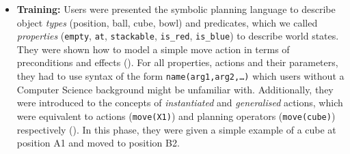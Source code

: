 \begin{itemize}
  \item{\begin{sloppypar} \textbf{Training:} Users were presented the symbolic planning language to describe object \textit{types} (\ie position, ball, cube, bowl) and predicates, which we called \textit{properties} (\ie \texttt{empty}, \texttt{at}, \texttt{stackable}, \texttt{is\_red}, \texttt{is\_blue}) to describe world states.
They were shown how to model a simple move action in terms of preconditions and effects ().
For all properties, actions and their parameters, they had to use syntax of the form \texttt{name(arg1,arg2,\dots)} which users without a  Computer Science background might be unfamiliar with.
Additionally, they were introduced to the concepts of \textit{instantiated} and \textit{generalised} actions, which were equivalent to actions (\eg \texttt{move(X1)}) and planning operators (\eg \texttt{move(cube)}) respectively ().
In this phase, they were given a simple example of a cube at position A1 and moved to position B2.\end{sloppypar}

}
\end{itemize}

